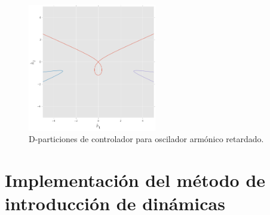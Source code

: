 \documentclass{article}
\begin{document}
\begin{figure}[htbp]
\centering
\includegraphics[width=0.5\textwidth]{../imagenes/oscarmcon.png}
\caption{D-particiones de controlador para oscilador armónico
retardado.}
\end{figure}

    \section{Implementación del método de introducción de
dinámicas}\label{implementaciuxf3n-del-muxe9todo-de-introducciuxf3n-de-dinuxe1micas}


    
    
    
    
\end{document}

